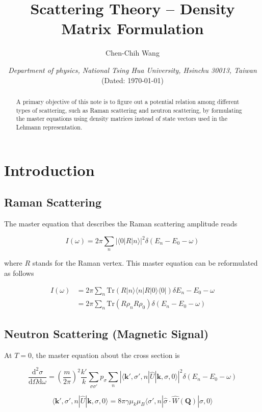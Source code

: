 \documentclass[12font]{article}
\title{\textbf{ Scattering Theory -- Density Matrix Formulation }}
\author{Chen-Chih Wang  }
\date{\textit{Department of physics, National Tsing Hua University, Hsinchu 30013, Taiwan} \\ (Dated: \today)}
\newcommand{\bra}[1]{\langle #1 |}
\newcommand{\ket}[1]{| #1 \rangle}
\newcommand{\lr}[1]{\left(  #1  \right)}
\newcommand{\abs}[1]{\left|  #1  \right|}
\newcommand{\mrm}[1]{\mathrm{#1}}
\newcommand{\bo}[1]{\mathbf{#1}}
\newcommand{\Tr}{\mrm{Tr}}
\begin{document}
\maketitle



\begin{abstract}
  A primary objective of this note is to figure out a potential relation among different types of scattering, such as Raman scattering and neutron scattering, by formulating the master equations using density matrices instead of state vectors used in the Lehmann representation. 
\end{abstract}

\section{Introduction}

\subsection{Raman Scattering}

The master equation that describes the Raman scattering amplitude reads

$$
I(\omega) = 2\pi\sum_{n}|\langle 0|R|n\rangle|^2\delta(E_n-E_0-\omega)
$$

where $R$ stands for the Raman vertex. This master equation can be reformulated as follows

\begin{align*}
I(\omega) &= 2\pi \sum_{n}\Tr\lr{R \ket{n}\bra{n} R \ket{0}\bra{0}} \delta{E_n - E_0 - \omega} \\
&= 2\pi \sum_{n}\Tr\lr{R \rho_n R \rho_0} \delta\lr{E_n - E_0 - \omega}
\end{align*}

\subsection{Neutron Scattering (Magnetic Signal)}

At $T=0$, the master equation about the cross section is

$$
\frac{\mrm{d}^2 \sigma}{\mrm{d}\Omega\mrm{d}\omega} = \lr{\frac{m}{2\pi}}^2 \frac{k'}{k}\sum_{\sigma\sigma'} p_\sigma \sum_{n} \abs{ \bra{\bo{k}',\sigma',n} \hat{U} \ket{\bo{k},\sigma,0} }^2 \delta\lr{E_n - E_0 - \omega}
$$

$$
\bra{\bo{k}',\sigma',n} \hat{U} \ket{\bo{k},\sigma,0} = 8\pi\gamma\mu_k\mu_B \bra{\sigma',n} \hat{\sigma}\cdot \hat{W}(\bo{Q}) \ket{\sigma,0}
$$
\end{document}
